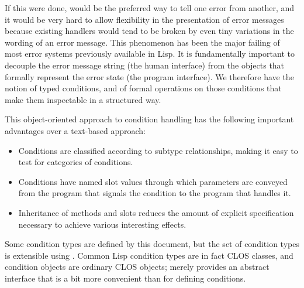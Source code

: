 If this were done,  would be the preferred way to tell one error
from another, and it would be very hard to allow flexibility in the
presentation of error messages because existing handlers would tend to be
broken by even tiny variations in the wording of an error message. This
phenomenon has been the major failing of most error systems previously
available in Lisp. It is fundamentally important to decouple the error
message string (the human interface) from the objects that formally
represent the error state (the program interface). We therefore have the
notion of typed conditions, and of formal operations on those conditions
that make them inspectable in a structured way.

This object-oriented approach to condition handling has the following
important advantages over a text-based approach:
\begin{itemize}
\item
   Conditions are classified according to subtype relationships, making
   it easy to test for categories of conditions.

\item
   Conditions have named slot values through which parameters are conveyed
   from the program that signals the condition to the program that handles it.

\item
   Inheritance of methods and slots reduces the amount of explicit
   specification necessary to achieve various interesting effects.
\end{itemize}

Some condition types are defined by this document, but the set of 
condition types is extensible using .
Common Lisp condition types are in fact CLOS classes, and condition objects
are ordinary CLOS objects;  merely
provides an abstract interface that is a bit more convenient than
 for defining conditions.

